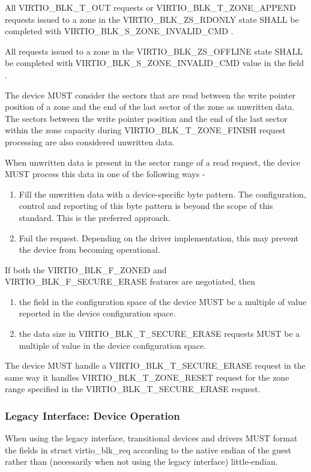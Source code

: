 All VIRTIO_BLK_T_OUT requests or VIRTIO_BLK_T_ZONE_APPEND requests issued
to a zone in the VIRTIO_BLK_ZS_RDONLY state SHALL be completed with
VIRTIO_BLK_S_ZONE_INVALID_CMD .

All requests issued to a zone in the VIRTIO_BLK_ZS_OFFLINE state SHALL be
completed with VIRTIO_BLK_S_ZONE_INVALID_CMD value in the field .

The device MUST consider the sectors that are read between the write pointer
position of a zone and the end of the last sector of the zone as unwritten data.
The sectors between the write pointer position and the end of the last sector
within the zone capacity during VIRTIO_BLK_T_ZONE_FINISH request processing are
also considered unwritten data.

When unwritten data is present in the sector range of a read request, the device
MUST process this data in one of the following ways -

\begin{enumerate}
\item Fill the unwritten data with a device-specific byte pattern. The
configuration, control and reporting of this byte pattern is beyond the scope
of this standard. This is the preferred approach.

\item Fail the request. Depending on the driver implementation, this may prevent
the device from becoming operational.
\end{enumerate}

If both the VIRTIO_BLK_F_ZONED and VIRTIO_BLK_F_SECURE_ERASE features are
negotiated, then

\begin{enumerate}
\item the field  in the configuration space
of the device MUST be a multiple of  value reported in the
device configuration space.

\item the data size in VIRTIO_BLK_T_SECURE_ERASE requests MUST be a multiple of
 value in the device configuration space.
\end{enumerate}

The device MUST handle a VIRTIO_BLK_T_SECURE_ERASE request in the same way it
handles VIRTIO_BLK_T_ZONE_RESET request for the zone range specified in the
VIRTIO_BLK_T_SECURE_ERASE request.

\subsubsection{Legacy Interface: Device Operation}\label{sec:Device Types / Block Device / Device Operation / Legacy Interface: Device Operation}
When using the legacy interface, transitional devices and drivers
MUST format the fields in struct virtio_blk_req
according to the native endian of the guest rather than
(necessarily when not using the legacy interface) little-endian.

